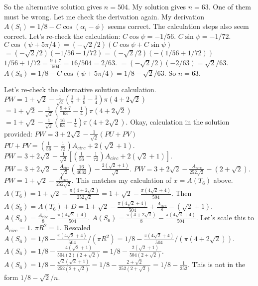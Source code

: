 So the alternative solution gives $n=504.$ My solution gives $n=63.$ One of them must be wrong. Let me check the derivation again. My derivation $A(S_i) = 1/8 - C \cos(\alpha_i - \phi)$ seems correct. The calculation steps also seem correct. 
Let's re-check the calculation: 
$C \cos \psi = -1/56.$ $C \sin \psi = -1/72.$ 
$C \cos(\psi + 5\pi/4) = (-\sqrt{2}/2) (C \cos \psi + C \sin \psi)$ 
$= (-\sqrt{2}/2) (-1/56 - 1/72) = (-\sqrt{2}/2) (- (1/56+1/72))$ 
$1/56 + 1/72 = \frac{9+7}{504} = 16/504 = 2/63.$ 
$= (-\sqrt{2}/2) (-2/63) = \sqrt{2}/63.$ 
$A(S_6) = 1/8 - C \cos(\psi + 5\pi/4) = 1/8 - \sqrt{2}/63.$ So $n=63.$

Let's re-check the alternative solution calculation. 
$PW = 1+\sqrt{2}- \frac{1}{\sqrt{2}}\left(\frac{1}{7}+\frac{1}{9}-\frac{1}{4}\right)\pi\left(4+2\sqrt{2}\right)$ 
$= 1+\sqrt{2} - \frac{1}{\sqrt{2}} (\frac{9+7}{63} - \frac{1}{4}) \pi (4+2\sqrt{2})$ 
$= 1+\sqrt{2} - \frac{1}{\sqrt{2}} (\frac{16}{63} - \frac{1}{4}) \pi (4+2\sqrt{2}).$ 
Okay, calculation in the solution provided: 
$PW = 3+2\sqrt2-\frac{1}{\sqrt{2}}(PU+PV)$ 
$PU+PV = (\frac{1}{56} - \frac{1}{72}) A_{circ} + 2(\sqrt{2}+1).$ 
$PW = 3+2\sqrt{2} - \frac{1}{\sqrt{2}} [ (\frac{1}{56} - \frac{1}{72}) A_{circ} + 2(\sqrt{2}+1) ].$ 
$PW = 3+2\sqrt{2} - \frac{A_{circ}}{\sqrt{2}} (\frac{16}{4032}) - \frac{2(\sqrt{2}+1)}{\sqrt{2}}.$ 
$PW = 3+2\sqrt{2} - \frac{A_{circ}}{252\sqrt{2}} - (2+\sqrt{2}).$ 
$PW = 1+\sqrt{2} - \frac{A_{circ}}{252\sqrt{2}}.$ This matches my calculation of $x=A(T_6)$ above. 
$A(T_6) = 1+\sqrt{2} - \frac{\pi(4+2\sqrt{2})}{252\sqrt{2}} = 1+\sqrt{2} - \frac{\pi(4\sqrt{2}+4)}{504}.$ 
Then $A(S_6) = A(T_6) + D = 1+\sqrt{2} - \frac{\pi(4\sqrt{2}+4)}{504} + \frac{A_{circ}}{8} - (\sqrt{2}+1).$ 
$A(S_6) = \frac{A_{circ}}{8} - \frac{\pi(4\sqrt{2}+4)}{504}.$ 
$A(S_6) = \frac{\pi(4+2\sqrt{2})}{8} - \frac{\pi(4\sqrt{2}+4)}{504}.$ 
Let's scale this to $A_{circ}=1.$ $\pi R^2=1.$ 
Rescaled $A(S_6) = 1/8 - \frac{\pi(4\sqrt{2}+4)}{504} / (\pi R^2) = 1/8 - \frac{\pi(4\sqrt{2}+4)}{504} / (\pi(4+2\sqrt{2})).$ 
$A(S_6) = 1/8 - \frac{4(\sqrt{2}+1)}{504(2)(2+\sqrt{2})} = 1/8 - \frac{2(\sqrt{2}+1)}{504(2+\sqrt{2})}.$ 
$A(S_6) = 1/8 - \frac{\sqrt{2}(\sqrt{2}+1)}{252(2+\sqrt{2})} = 1/8 - \frac{2+\sqrt{2}}{252(2+\sqrt{2})} = 1/8 - \frac{1}{252}.$ 
This is not in the form $1/8 - \sqrt{2}/n.$

